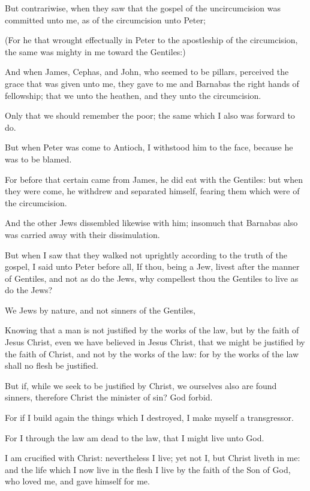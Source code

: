 {But
contrariwise, when they
saw
that the
gospel of the
uncircumcision was committed unto
me,
as
{} of the
circumcision
{} unto
Peter;

(For he
that wrought
effectually in
Peter
to the
apostleship of the
circumcision, the same was
mighty in
me
toward the
Gentiles:)

And when
James,
Cephas,
and
John,
who
seemed to
be
pillars,
perceived the
grace
that was
given unto
me, they
gave to
me
and
Barnabas the right
hands of
fellowship;
that
we
{}
unto the
heathen,
and
they
unto the
circumcision.

Only
{}
that we should
remember the
poor; the
same
which
I
also was
forward to
do.

But
when
Peter was
come
to
Antioch, I
withstood
him
to the
face,
because he
was to be
blamed.

For
before
that
certain
came
from
James, he did
eat
with the
Gentiles:
but
when they were
come, he
withdrew
and
separated
himself,
fearing them
which were
of the
circumcision.

And the
other
Jews
dissembled
likewise with
him; insomuch
that
Barnabas
also was carried away
with
their
dissimulation.

But
when I
saw
that they
walked
not
uprightly according
to the
truth of the
gospel, I
said unto
Peter
before
{}
all,
If
thou,
being a
Jew,
livest after the manner of
Gentiles,
and
not as do the
Jews,
why compellest
thou the
Gentiles to live as do the
Jews?

We
{}
Jews by
nature,
and
not
sinners
of the
Gentiles,

Knowing
that a
man
is
not
justified
by the
works of the
law,
but
by the
faith of
Jesus
Christ,
even
we have
believed
in
Jesus
Christ,
that we might be
justified
by the
faith of
Christ,
and
not
by the
works of the
law: for
by the
works
of the
law
shall
no
flesh be
justified.

But
if, while we
seek to be
justified
by
Christ, we
ourselves
also are
found
sinners,
{}
therefore
Christ the
minister of
sin? God
forbid.

For
if I
build
again the
things
which I
destroyed, I
make
myself a
transgressor.

For
I
through the
law am
dead to the
law,
that I might
live unto
God.

I am crucified
with
Christ:
nevertheless I
live; yet
not
I,
but
Christ
liveth
in
me:
and the life
which
I
now
live
in the
flesh I
live
by the
faith of the
Son of
God,
who
loved
me,
and
gave
himself
for
me.

}
